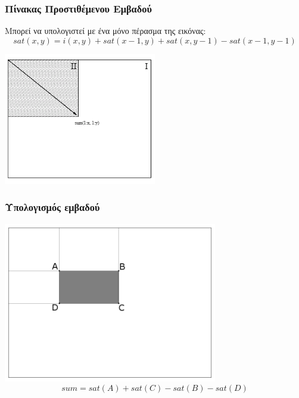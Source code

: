 \documentclass{beamer}
\begin{document}
\begin{frame}
\frametitle{Πίνακας Προστιθέμενου Εμβαδού}
Μπορεί να υπολογιστεί με ένα μόνο πέρασμα της εικόνας:
\begin{equation*}
sat(x,y) = i(x,y) + sat(x-1,y) + sat(x,y-1) - sat(x-1,y-1)
\end{equation*}

\begin{center}
\includegraphics[width=0.5\textwidth]{images/integral-image-generation}
\end{center}
\end{frame}

\begin{frame}
\frametitle{Υπολογισμός εμβαδού}
\begin{center}
\includegraphics[width=0.7\textwidth]{images/integral-image}
\begin{equation*}
sum = sat(A) + sat(C) - sat(B) - sat(D)
\end{equation*}
\end{center}
\end{frame}
\end{document}
